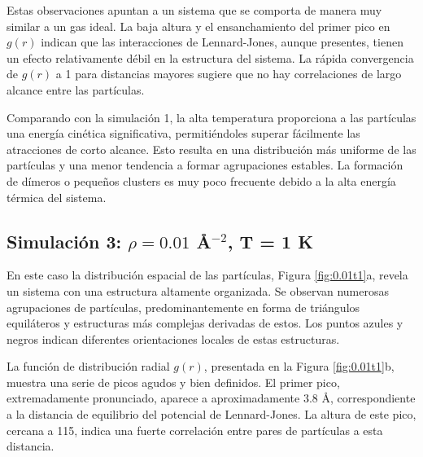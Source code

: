 Estas observaciones apuntan a un sistema que se comporta de manera muy similar a un gas ideal. La baja altura y el ensanchamiento del primer pico en $g(r)$ indican que las interacciones de Lennard-Jones, aunque presentes, tienen un efecto relativamente débil en la estructura del sistema. La rápida convergencia de $g(r)$ a 1 para distancias mayores sugiere que no hay correlaciones de largo alcance entre las partículas.

\vspace{\baselineskip}
	
Comparando con la simulación 1, la alta temperatura proporciona a las partículas una energía cinética significativa, permitiéndoles superar fácilmente las atracciones de corto alcance. Esto resulta en una distribución más uniforme de las partículas y una menor tendencia a formar agrupaciones estables. La formación de dímeros o pequeños clusters es muy poco frecuente debido a la alta energía térmica del sistema.
	
	




\subsection{Simulación 3: $\rho = 0.01$ \AA$^{-2}$, T = 1 K}


En este caso la distribución espacial de las partículas, Figura \ref{fig:0.01t1}a, revela un sistema con una estructura altamente organizada. Se observan numerosas agrupaciones de partículas, predominantemente en forma de triángulos equiláteros y estructuras más complejas derivadas de estos. Los puntos azules y negros indican diferentes orientaciones locales de estas estructuras.

\vspace{\baselineskip}

La función de distribución radial $g(r)$, presentada en la Figura \ref{fig:0.01t1}b, muestra una serie de picos agudos y bien definidos. El primer pico, extremadamente pronunciado, aparece a aproximadamente 3.8 Å, correspondiente a la distancia de equilibrio del potencial de Lennard-Jones. La altura de este pico, cercana a 115, indica una fuerte correlación entre pares de partículas a esta distancia.


